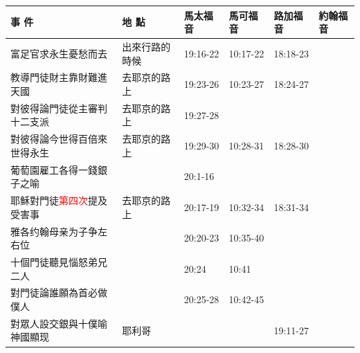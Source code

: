 \begin{table}[H]
  \centering
    \begin{tabular}{p{14em}|p{7.93em}|l|l|l|p{4.855em}}
    \toprule
    \textbf{事 件} & \textbf{地 點} & \multicolumn{1}{p{5.285em}|}{\textbf{馬太福音}} & \multicolumn{1}{p{5.57em}|}{\textbf{馬可福音}} & \multicolumn{1}{p{5.285em}|}{\textbf{路加福音}} & \textbf{約翰福音} \\  \midrule

富足官求永生憂愁而去&出來行路的時候&\multicolumn{1}{p{5.285em}|}{19:16-22}&\multicolumn{1}{p{5.285em}|}{10:17-22}& \multicolumn{1}{p{5.285em}|}{18:18-23} & \multicolumn{1}{l}{} \\\midrule

教導門徒財主靠財難進天國&去耶京的路上& \multicolumn{1}{p{5.285em}|}{19:23-26} & \multicolumn{1}{p{5.57em}|}{10:23-27} & \multicolumn{1}{p{5.285em}|}{18:24-27} & \multicolumn{1}{l}{} \\\midrule

對彼得論門徒從主審判十二支派&去耶京的路上& \multicolumn{1}{p{5.285em}|}{19:27-28} & \multicolumn{1}{p{5.57em}|}{} & \multicolumn{1}{p{5.285em}|}{} & \multicolumn{1}{l}{} \\\midrule

對彼得論今世得百倍來世得永生&去耶京的路上& \multicolumn{1}{p{5.285em}|}{19:29-30} & \multicolumn{1}{p{5.57em}|}{10:28-31} & \multicolumn{1}{p{5.285em}|}{18:28-30} & \multicolumn{1}{l}{} \\\midrule

葡萄園雇工各得一錢銀子之喻 && \multicolumn{1}{p{5.285em}|}{20:1-16} &       &       & \multicolumn{1}{l}{} \\\midrule

耶穌對門徒\textcolor{red}{第四次}提及受害事 &去耶京的路上& \multicolumn{1}{p{5.285em}|}{20:17-19} & \multicolumn{1}{p{5.57em}|}{10:32-34} & \multicolumn{1}{p{5.285em}|}{18:31-34} & \multicolumn{1}{l}{} \\\midrule


雅各约翰母亲为子争左右位&  & \multicolumn{1}{p{5.285em}|}{20:20-23} & \multicolumn{1}{p{5.57em}|}{10:35-40} &       & \multicolumn{1}{l}{} \\\midrule
十個門徒聽見惱怒弟兄二人&   & \multicolumn{1}{p{5.285em}|}{20:24} & \multicolumn{1}{p{5.57em}|}{10:41} &       & \multicolumn{1}{l}{} \\\midrule
對門徒論誰願為首必做僕人&   & \multicolumn{1}{p{5.285em}|}{20:25-28} & \multicolumn{1}{p{5.57em}|}{10:42-45} &       & \multicolumn{1}{l}{} \\\midrule
對眾人設交銀與十僕喻神國顯现 & 耶利哥   &       &       & \multicolumn{1}{p{5.285em}|}{19:11-27} & \multicolumn{1}{l}{} \\ \midrule

\end{tabular}%
\end{table}%




